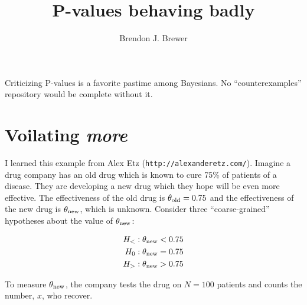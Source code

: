 \documentclass[a4paper, 12pt]{article}
\title{P-values behaving badly}
\author{Brendon J. Brewer}
\begin{document}
\maketitle

Criticizing P-values is a favorite pastime among Bayesians. No
``counterexamples'' repository would be complete without it.

\section{Voilating {\em more}}
I learned this example from Alex Etz ({\tt http://alexanderetz.com/}).
Imagine a drug company has an old drug which is known to cure
75\% of patients of a disease. They are developing a new drug
which they hope will be even more effective.
The effectiveness of the old drug is $\theta_{\rm old} = 0.75$ and the
effectiveness of the new drug is $\theta_{\rm new}$, which is unknown.
Consider three ``coarse-grained''
hypotheses about the value of $\theta_{\rm new}$:

\begin{eqnarray}
H_<: \theta_{\rm new} < 0.75\\
H_0: \theta_{\rm new} = 0.75\\
H_>: \theta_{\rm new} > 0.75
\end{eqnarray}

To measure $\theta_{\rm new}$, the company tests the drug on $N=100$ patients
and counts the number, $x$, who recover.
\end{document}
